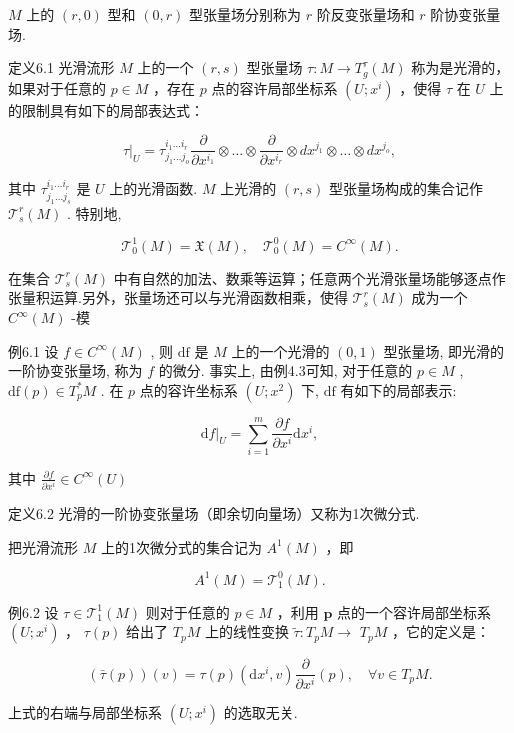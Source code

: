 $M$  上的  $(r,0)$  型和  $(0,r)$  型张量场分别称为  $r$  阶反变张量场和  $r$  阶协变张量场.

定义6.1 光滑流形  $M$  上的一个  $(r, s)$  型张量场  $\tau: M \to T_{g}^{\tau}(M)$  称为是光滑的，如果对于任意的  $p \in M$ ，存在  $p$  点的容许局部坐标系  $(U; x^{i})$ ，使得  $\tau$  在  $U$  上的限制具有如下的局部表达式：

$$
\tau | _ {U} = \tau_ {j _ {1} \dots j _ {o}} ^ {i _ {1} \dots i _ {r}} \frac {\partial}{\partial x ^ {i _ {1}}} \otimes \dots \otimes \frac {\partial}{\partial x ^ {i _ {r}}} \otimes d x ^ {j _ {1}} \otimes \dots \otimes d x ^ {j _ {o}},
$$

其中  $\tau_{j_1\dots j_s}^{i_1\dots i_r}$  是  $U$  上的光滑函数.  $M$  上光滑的  $(r,s)$  型张量场构成的集合记作  $\mathcal{T}_s^r (M)$ . 特别地,

$$
\mathcal {T} _ {0} ^ {1} (M) = \mathfrak {X} (M), \quad \mathcal {T} _ {0} ^ {0} (M) = C ^ {\infty} (M).
$$

在集合  $\mathcal{T}_s^r (M)$  中有自然的加法、数乘等运算；任意两个光滑张量场能够逐点作张量积运算.另外，张量场还可以与光滑函数相乘，使得 $\mathcal{T}_s^r (M)$  成为一个  $C^\infty (M)$  -模

例6.1 设  $f \in C^{\infty}(M)$ , 则  $\mathrm{df}$  是  $M$  上的一个光滑的  $(0,1)$  型张量场, 即光滑的一阶协变张量场, 称为  $f$  的微分. 事实上, 由例4.3可知, 对于任意的  $p \in M$ ,  $\mathrm{df}(p) \in T_p^* M$ . 在  $p$  点的容许坐标系  $(U; x^2)$  下,  $\mathrm{df}$  有如下的局部表示:

$$
\mathrm {d} f | _ {U} = \sum_ {i = 1} ^ {m} \frac {\partial f}{\partial x ^ {i}} \mathrm {d} x ^ {i},
$$

其中  $\frac{\partial f}{\partial x^i} \in C^\infty(U)$

定义6.2 光滑的一阶协变张量场（即余切向量场）又称为1次微分式.

把光滑流形  $M$  上的1次微分式的集合记为  $A^1 (M)$  ，即

$$
A ^ {1} (M) = \mathcal {T} _ {1} ^ {0} (M).
$$

例6.2 设  $\tau \in \mathcal{T}_1^1 (M)$  则对于任意的  $p\in M$  ，利用  $\pmb{p}$  点的一个容许局部坐标系  $(U;x^{i})$  ，  $\tau (p)$  给出了  $T_{p}M$  上的线性变换  $\tilde{\tau}:T_pM\to$ $T_{p}M$  ，它的定义是：

$$
(\bar {\tau} (p)) (v) = \tau (p) \left(\mathrm {d} x ^ {i}, v\right) \frac {\partial}{\partial x ^ {i}} (p), \quad \forall v \in T _ {p} M. %
$$

上式的右端与局部坐标系  $(U; x^i)$  的选取无关.

